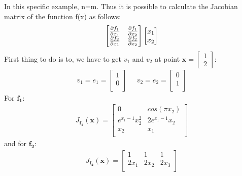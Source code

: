 \documentclass[12pt]{article}
\begin{document}
\begin{qsolve}
    In this specific example, n=m. Thus it is possible to calculate the Jacobian matrix of the function f(x) as follows:
    \begin{gather*}
        \begin{bmatrix}
            \pdv{f_1}{x_1} & \pdv{f_1}{x_2} \\
            \pdv{f_2}{x_1} & \pdv{f_2}{x_2} \\
        \end{bmatrix}
        \begin{bmatrix}
            x_1 \\
            x_2 \\
        \end{bmatrix}
    \end{gather*}
    First thing to do is to, we have to get $v_1$ and $v_2$ at point $\mathbf{x} = \begin{bmatrix}
            1 \\
            2
        \end{bmatrix}$:
    \begin{gather*}
        v_1 = e_1 = \begin{bmatrix}
            1 \\
            0 \\
        \end{bmatrix}
        \; \; \; \; \;
        v_2 = e_2 = \begin{bmatrix}
            0 \\
            1 \\
        \end{bmatrix}
    \end{gather*}
    For $\mathbf{f_1}$:
    \begin{gather*}
        J_{\mathbf{f_1}}(\mathbf{x}) =
        \begin{bmatrix}
            0                 & cos(\pi x_2)   \\
            e^{x_1 -1}x^{2}_2 & 2e^{x_1 -1}x_2 \\
            x_2               & x_1            \\
        \end{bmatrix}
    \end{gather*}
    and for $\mathbf{f_2}$:
    \begin{gather*}
        J_{\mathbf{f_2}}(\mathbf{x}) =
        \begin{bmatrix}
            1    & 1    & 1    \\
            2x_1 & 2x_2 & 2x_3 \\

\end{bmatrix}
\end{gather*}
\end{qsolve}
\end{document}
